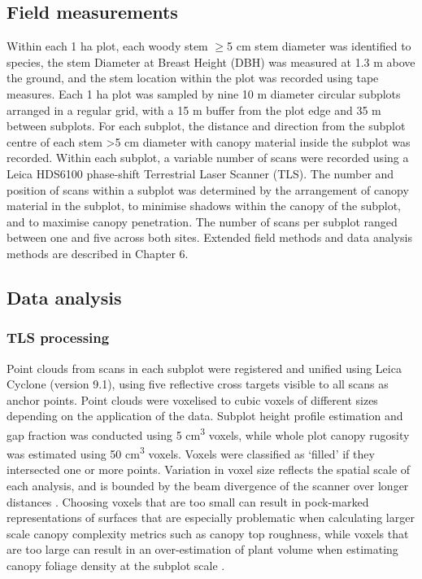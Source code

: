 \documentclass[11pt,a4paper]{article}
\begin{document}
\subsection{Field measurements}

Within each 1 ha plot, each woody stem $\ge{}$5 cm stem diameter was identified to species, the stem Diameter at Breast Height (DBH) was measured at 1.3 m above the ground, and the stem location within the plot was recorded using tape measures. Each 1 ha plot was sampled by nine 10 m diameter circular subplots arranged in a regular grid, with a 15 m buffer from the plot edge and 35 m between subplots. For each subplot, the distance and direction from the subplot centre of each stem >5 cm diameter with canopy material inside the subplot was recorded. Within each subplot, a variable number of scans were recorded using a Leica HDS6100 phase-shift Terrestrial Laser Scanner (TLS). The number and position of scans within a subplot was determined by the arrangement of canopy material in the subplot, to minimise shadows within the canopy of the subplot, and to maximise canopy penetration. The number of scans per subplot ranged between one and five across both sites. Extended field methods and data analysis methods are described in Chapter 6.

\subsection{Data analysis}

\subsubsection{TLS processing}

Point clouds from scans in each subplot were registered and unified using Leica Cyclone (version 9.1), using five reflective cross targets visible to all scans as anchor points. Point clouds were voxelised to cubic voxels of different sizes depending on the application of the data. Subplot height profile estimation and gap fraction was conducted using 5 cm\textsuperscript{3} voxels, while whole plot canopy rugosity was estimated using 50 cm\textsuperscript{3} voxels. Voxels were classified as `filled' if they intersected one or more points. Variation in voxel size reflects the spatial scale of each analysis, and is bounded by the beam divergence of the scanner over longer distances \citep{Cifuentes2014}. Choosing voxels that are too small can result in pock-marked representations of surfaces that are especially problematic when calculating larger scale canopy complexity metrics such as canopy top roughness, while voxels that are too large can result in an over-estimation of plant volume when estimating canopy foliage density at the subplot scale \citep{Seidel2012, Cifuentes2014}. 
\end{document}
